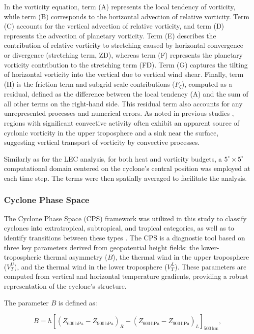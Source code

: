 \documentclass[pdflatex,sn-chicago]{sn-jnl}%
\theoremstyle{plain}
\theoremstyle{definition}
\theoremstyle{remark}
\theoremstyle{definition}
\begin{document}
In the vorticity equation, term (A) represents the local tendency of vorticity, while term (B) corresponds to the horizontal advection of relative vorticity. Term (C) accounts for the vertical advection of relative vorticity, and term (D) represents the advection of planetary vorticity. Term (E) describes the contribution of relative vorticity to stretching caused by horizontal convergence or divergence (stretching term, ZD), whereas term (F) represents the planetary vorticity contribution to the stretching term (FD). Term (G) captures the tilting of horizontal vorticity into the vertical due to vertical wind shear. Finally, term (H) is the friction term and subgrid scale contributions ($F_{\zeta}$), computed as a residual, defined as the difference between the local tendency (A) and the sum of all other terms on the right-hand side. This residual term also accounts for any unrepresented processes and numerical errors. As noted in previous studies \citep[e.g.,]{reed1974vorticity, chu1981effects}, regions with significant convective activity often exhibit an apparent source of cyclonic vorticity in the upper troposphere and a sink near the surface, suggesting vertical transport of vorticity by convective processes.

Similarly as for the LEC analysis, for both heat and vorticity budgets, a \(5^\circ \times 5^\circ\) computational domain centered on the cyclone's central position was employed at each time step. The terms were then spatially averaged to facilitate the analysis.


\subsubsection{Cyclone Phase Space}

The Cyclone Phase Space (CPS) framework was utilized in this study to classify cyclones into extratropical, subtropical, and tropical categories, as well as to identify transitions between these types \citep{hart2003cyclone}. The CPS is a diagnostic tool based on three key parameters derived from geopotential height fields: the lower-tropospheric thermal asymmetry (\(B\)), the thermal wind in the upper troposphere (\(V_T^U\)), and the thermal wind in the lower troposphere (\(V_T^L\)). These parameters are computed from vertical and horizontal temperature gradients, providing a robust representation of the cyclone's structure.

The parameter \(B\) is defined as:

\begin{equation}
B = h \left[ \left( \overline{Z_{600\, \text{hPa}} - Z_{900\, \text{hPa}}} \right)_R - \left( \overline{Z_{600\, \text{hPa}} - Z_{900\, \text{hPa}}} \right)_L \right]_{500\, \text{km}},
\end{equation}
\end{document}
